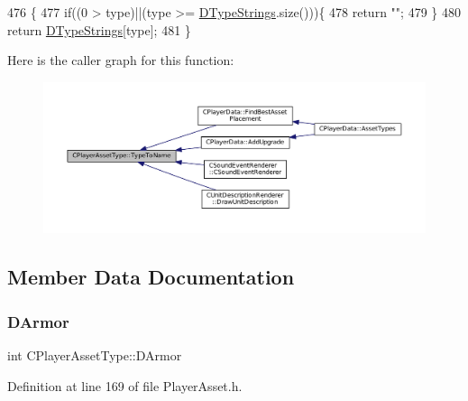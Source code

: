 \begin{DoxyCode}
476                                                      \{
477     \textcolor{keywordflow}{if}((0 > type)||(type >= \hyperlink{classCPlayerAssetType_a1f87f6f8c42b692a500c875e9359a438}{DTypeStrings}.size()))\{
478         \textcolor{keywordflow}{return} \textcolor{stringliteral}{""};
479     \}
480     \textcolor{keywordflow}{return} \hyperlink{classCPlayerAssetType_a1f87f6f8c42b692a500c875e9359a438}{DTypeStrings}[type];
481 \}
\end{DoxyCode}
Here is the caller graph for this function\+:\nopagebreak
\begin{figure}[H]
\begin{center}
\leavevmode
\includegraphics[width=350pt]{classCPlayerAssetType_a66ce89c35b74940e9fc947a1f4b9e770_icgraph}
\end{center}
\end{figure}


\subsection{Member Data Documentation}
\hypertarget{classCPlayerAssetType_ac211254f807a497099509a3e96f7185a}{}\label{classCPlayerAssetType_ac211254f807a497099509a3e96f7185a} 
\subsubsection{\texorpdfstring{D\+Armor}{DArmor}}
{\footnotesize\ttfamily int C\+Player\+Asset\+Type\+::\+D\+Armor\hspace{0.3cm}{\ttfamily [protected]}}



Definition at line 169 of file Player\+Asset.\+h.

\hypertarget{classCPlayerAssetType_a76d89bd6479ac30a0452d0a8aaf731c5}{}\label{classCPlayerAssetType_a76d89bd6479ac30a0452d0a8aaf731c5} 
